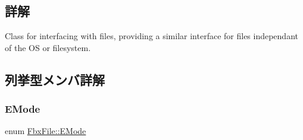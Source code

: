 \subsection{詳解}
Class for interfacing with files, providing a similar interface for files independant of the OS or filesystem. 

\subsection{列挙型メンバ詳解}
\mbox{\label{class_fbx_file_a0370e8fd17b3658f718e1350a6a6f462}} 
\subsubsection{\texorpdfstring{E\+Mode}{EMode}}
{\footnotesize\ttfamily enum \hyperlink{class_fbx_file_a0370e8fd17b3658f718e1350a6a6f462}{Fbx\+File\+::\+E\+Mode}}

